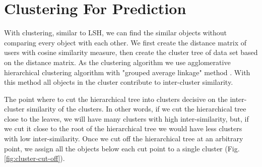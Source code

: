 \documentclass[conference]{IEEEtran}
\begin{document}
\section{Clustering For Prediction}
\label{sec:cluster-prediction}

With clustering, similar to LSH, we can find the similar objects without 
comparing every object with each other. We first create the distance matrix of 
users with cosine similarity measure, then create the cluster tree of data set 
based on the distance matrix. As the clustering algorithm we use agglomerative 
hierarchical clustering algorithm with "grouped average linkage" method 
\cite{ward1963hierarchical}. With this method all objects in the cluster 
contribute to inter-cluster similarity.

The point where to cut the hierarchical tree into clusters decisive on the 
inter-cluster similarity of the clusters. In other words, if we cut the 
hierarchical tree close to the leaves, we will have many clusters with high 
inter-similarity, but, if we cut it close to the root of the hierarchical tree 
we would have less clusters with low inter-similarity. Once we cut off the 
hierarchical tree at an arbitrary point, we assign all the objects below each 
cut point to a single cluster (Fig. \ref{fig:cluster-cut-off}). 
\end{document}
